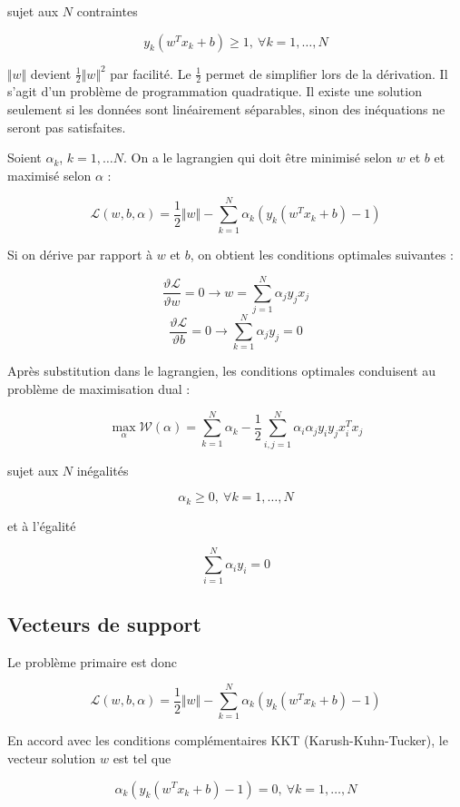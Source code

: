 	sujet aux $N$ contraintes
	
	$$y_k(w^T x_k + b) \geq 1, \: \forall k = 1, \dots , N$$

	$\Vert w \Vert$ devient $\frac{1}{2} \Vert w \Vert^2$ par facilité. Le $\frac{1}{2}$ permet de simplifier lors de la dérivation. Il s'agit d'un problème de programmation quadratique. Il existe une solution seulement si les données sont linéairement séparables, sinon des inéquations ne seront pas satisfaites.
	
	
	Soient $\alpha_k$, $k = 1, \dots N$. On a le lagrangien qui doit être minimisé selon $w$ et $b$ et maximisé selon $\alpha$ :
	
	$$\mathcal{L}(w, b, \alpha) = \frac{1}{2} \Vert w \Vert - \sum_{k = 1}^N \alpha_k (y_k (w^Tx_k + b) - 1)$$
	
	Si on dérive par rapport à $w$ et $b$, on obtient les conditions optimales suivantes :
	
	$$\frac{\vartheta \mathcal{L}}{\vartheta w} = 0 \rightarrow w = \sum_{j = 1}^N \alpha_j y_j x_j$$
	$$\frac{\vartheta \mathcal{L}}{\vartheta b} = 0 \rightarrow \sum_{k = 1}^N \alpha_j y_j = 0$$
	
	Après substitution dans le lagrangien, les conditions optimales conduisent au problème de maximisation dual :
	
	$$\max_{\alpha} \mathcal{W}(\alpha) = \sum_{k = 1}^N \alpha_k - \frac{1}{2} \sum_{i, j = 1}^N \alpha_i \alpha_j y_i y_j x_i^T x_j$$
	
	sujet aux $N$ inégalités
	
	$$\alpha_k \geq 0, \: \forall k = 1, \dots, N$$
	
	et à l'égalité
	
	$$\sum_{i = 1}^N \alpha_i y_i = 0$$
	
	
	\subsection{Vecteurs de support}
	
	Le problème primaire est donc
	
	$$\mathcal{L}(w, b, \alpha) = \frac{1}{2} \Vert w \Vert - \sum_{k = 1}^N \alpha_k (y_k (w^Tx_k + b) - 1)$$
	
	En accord avec les conditions complémentaires KKT (Karush-Kuhn-Tucker), le vecteur solution $w$ est tel que
	
	$$\alpha_k (y_k (w^T x_k + b) - 1) = 0, \: \forall k = 1, \dots , N$$
	
